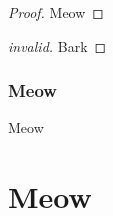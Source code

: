 \documentclass{article}
\newcommand{\sunpacke}{\unpacke{\sfontsym}{\sfont}}
\newcommand{\slete}{\lete{\sfontsym}{\sfont}}
\newcommand{\sfolde}{\folde{\sfontsym}{\sfont}}
\newcommand{\sunfolde}{\unfolde{\sfontsym}{\sfont}}
\newcommand{\sunite}{\unite{\sfontsym}{\sfont}}
\newcommand{\struee}{\truee{\sfontsym}{\sfont}}
\newcommand{\sfalsee}{\falsee{\sfontsym}{\sfont}}
\newcommand{\spaire}{\paire{\sfontsym}{\sfont}}
\begin{document}
\begin{smathpar}
  \sunpacke{\salpha}{\sx}{\svpr}{\seone}

  \telet{\tx}{\te}{\teone}

  \slete{\sx}{\se}{\seone}

  \sfolde{\tmuty{\salpha}{\styone}}{\sty}

  \sunfolde{\seone}

  \sunite

  \struee

  \sfalsee

  \spaire{\seone}{\svtwopr}

  \stx

  \stalphaonepr

  \stxpr[100]
  \stxonepr[5]

  \ctxtyjudg{\tfont}{\tfont{\ectx}}{\tfont{\Gamma}}{\tty}{\tfont{\Gamma}}{\ttypr}

  \rho

  \mapat{\rho}{\talpha}

  \maponeat{\rho}{\talpha}

  \maptwoat{\rho}{\talpha}

  \maprelat{\rho}{\talpha}

  \mapext{\rho}{\talpha}{\tty}

\end{smathpar}

%

\begin{proof}
  Meow
\end{proof}

\begin{proof}[invalid]
  Bark
\end{proof}


\subsubsection{Meow}
Meow

\section{Meow}
\end{document}
